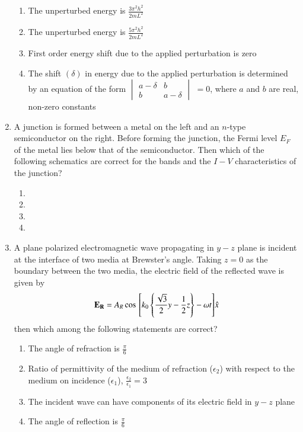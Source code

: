\documentclass[journal]{IEEEtran}
\begin{document}
\begin{enumerate}
\begin{enumerate}
\item The unperturbed energy is $\frac{3\pi^2h^2}{2mL^2}$
\item The unperturbed energy is $\frac{5\pi^2h^2}{2mL^2}$
\item First order energy shift due to the applied perturbation is zero
\item The shift $(\delta)$ in energy due to the applied perturbation is determined by an equation of the form $\begin{vmatrix}
a-\delta & b \\
b & a-\delta
\end{vmatrix}$
$=0$, where $a$ and $b$ are real, non-zero constants
\end{enumerate}

\item A junction is formed between a metal on the left and an $n$-type semiconductor on the right. Before forming the junction, the Fermi level $E_F$ of the metal lies below that of the semiconductor. Then which of the following schematics are correct for the bands and the $I-V$ characteristics of the junction?

\begin{enumerate}
\item 
\item 
\item 
\item 
\end{enumerate}

\item A plane polarized electromagnetic wave propagating in $y-z$ plane is incident at the interface of two media at Brewster's angle. Taking $z=0$ as the boundary between the two media, the electric field of the reflected wave is given by
$$\mathbf{E_R} = A_R \cos{\ensuremath{{}\left[k_0\left\{\frac{\sqrt{3}}{2}y - \frac{1}{2}z\right\}-\omega t\right]}}\hat{x}$$
then which among the following statements are correct?

\begin{enumerate}
\item The angle of refraction is $\frac{\pi}{6}$
\item Ratio of permittivity of the medium of refraction ($\epsilon_2$) with respect to the medium on incidence ($\epsilon_1$), $\frac{\epsilon_2}{\epsilon_1}=3$
\item The incident wave can have components of its electric field in $y-z$ plane
\item The angle of reflection is $\frac{\pi}{6}$
\end{enumerate}


\end{enumerate}
\end{document}
